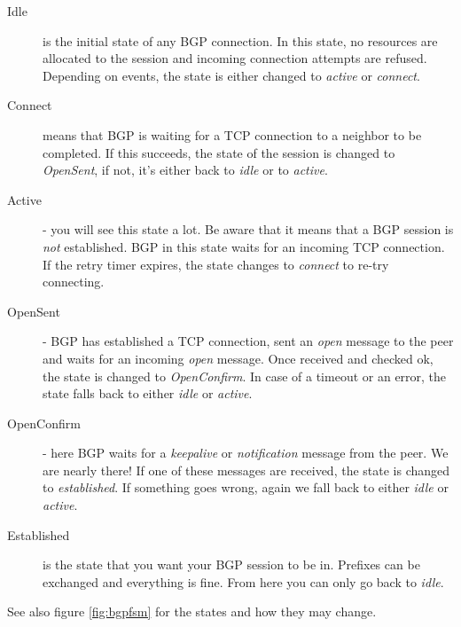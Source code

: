 \begin{description}
  \item[Idle] is the initial state of any BGP connection. In this state, no resources are allocated to the session and incoming connection attempts are refused. Depending on events, the state is either changed to \emph{active} or \emph{connect}.
  \item[Connect] means that BGP is waiting for a TCP connection to a neighbor to be completed. If this succeeds, the state of the session is changed to \emph{OpenSent}, if not, it's either back to \emph{idle} or to \emph{active}.
  \item[Active] - you will see this state a lot. Be aware that it means that a BGP session is \emph{not} established. BGP in this state waits for an incoming TCP connection. If the retry timer expires, the state changes to \emph{connect} to re-try connecting.
  \item[OpenSent] - BGP has established a TCP connection, sent an \emph{open} message to the peer and waits for an incoming \emph{open} message. Once received and checked ok, the state is changed to \emph{OpenConfirm}. In case of a timeout or an error, the state falls back to either \emph{idle} or \emph{active}.
  \item[OpenConfirm] - here BGP waits for a \emph{keepalive} or \emph{notification} message from the peer. We are nearly there! If one of these messages are received, the state is changed to \emph{established}. If something goes wrong, again we fall back to either \emph{idle} or \emph{active}.
  \item[Established] is the state that you want your BGP session to be in. Prefixes can be exchanged and everything is fine. From here you can only go back to \emph{idle}.
\end{description}
See also figure \ref{fig:bgpfsm} for the states and how they may change.

